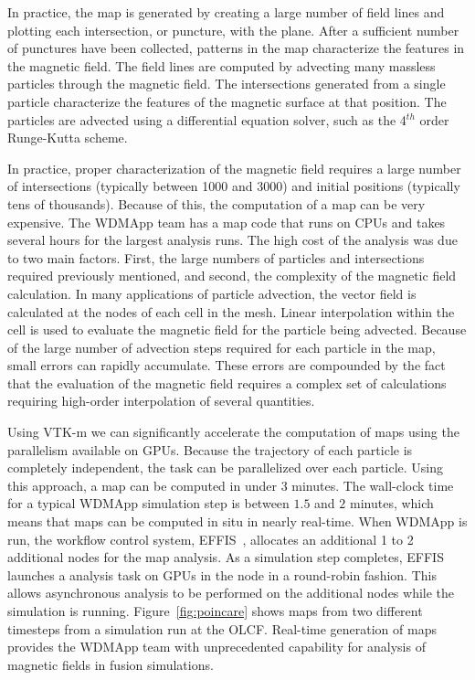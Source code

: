 In practice, the \poincare map is generated by creating a large number of field lines and plotting each intersection, or puncture, with the plane.
After a sufficient number of punctures have been collected, patterns in the map characterize the features in the magnetic field.
The field lines are computed by advecting many massless particles through the magnetic field.
The intersections generated from a single particle characterize the features of the magnetic surface at that position.
The particles are advected using a differential equation solver, such as the 4$^{th}$ order Runge-Kutta scheme.

In practice, proper characterization of the magnetic field requires a large number of intersections (typically between 1000 and 3000) and initial positions (typically tens of thousands).
Because of this, the computation of a \poincare map can be very expensive.
The WDMApp team has a \poincare map code that runs on CPUs and takes several hours for the largest analysis runs. 
The high cost of the analysis was due to two main factors. First, the large numbers of particles and intersections required previously mentioned, and second, the complexity of the magnetic field calculation.  In many applications of particle advection, the vector field is calculated at the nodes of each cell in the mesh. Linear interpolation within the cell is used to evaluate the magnetic field for the particle being advected. Because of the large number of advection steps required for each particle in the \poincare map, small errors can rapidly accumulate. These errors are compounded by the fact that the evaluation of the magnetic field requires a complex set of calculations requiring high-order interpolation of several quantities.

Using VTK-m we can significantly accelerate the computation of \poincare maps using the parallelism available on GPUs. Because the trajectory of each particle is completely independent, the task can be parallelized over each particle. Using this approach, a \poincare map can be computed in under $3$ minutes. The wall-clock time for a typical WDMApp simulation step is between $1.5$ and $2$ minutes, which means that \poincare maps can be computed in situ in nearly real-time.
When WDMApp is run, the workflow control system, EFFIS~\cite{Suchyta2022:effis}, allocates an additional 1 to 2 additional nodes for the \poincare map analysis. As a simulation step completes, EFFIS launches a \poincare analysis task on GPUs in the node in a round-robin fashion. This allows asynchronous analysis to be performed on the additional nodes while the simulation is running. Figure~\ref{fig:poincare} shows \poincare maps from two different timesteps from a simulation run at the OLCF.
Real-time generation of \poincare maps provides the WDMApp team with unprecedented capability for analysis of magnetic fields in fusion simulations.




